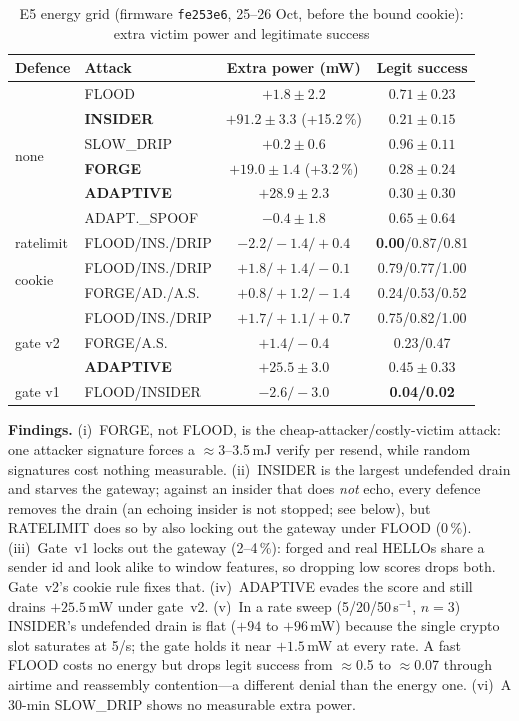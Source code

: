 \documentclass[conference]{IEEEtran}
\begin{document}
\begin{table}[t]
\caption{E5 energy grid (firmware \texttt{fe253e6}, 25--26 Oct, before the bound cookie): extra victim power and
legitimate success}
\label{tab:e5}
\centering\small
\setlength{\tabcolsep}{2pt}\footnotesize
\begin{tabular}{llcc}
\toprule
Defence & Attack & Extra power (mW) & Legit success\\
\midrule
\multirow{6}{*}{none} & FLOOD & $+1.8\pm2.2$ & $0.71\pm0.23$\\
 & \textbf{INSIDER} & $\mathbf{+91.2\pm3.3}$ (+15.2\,\%) & $0.21\pm0.15$\\
 & SLOW\_DRIP & $+0.2\pm0.6$ & $0.96\pm0.11$\\
 & \textbf{FORGE} & $\mathbf{+19.0\pm1.4}$ (+3.2\,\%) & $0.28\pm0.24$\\
 & \textbf{ADAPTIVE} & $\mathbf{+28.9\pm2.3}$ & $0.30\pm0.30$\\
 & ADAPT.\_SPOOF & $-0.4\pm1.8$ & $0.65\pm0.64$\\
\midrule
ratelimit & FLOOD/INS./DRIP & $-2.2/-1.4/+0.4$ & \textbf{0.00}/0.87/0.81\\
\midrule
\multirow{2}{*}{cookie} & FLOOD/INS./DRIP & $+1.8/+1.4/-0.1$ & 0.79/0.77/1.00\\
 & FORGE/AD./A.S. & $+0.8/+1.2/-1.4$ & 0.24/0.53/0.52\\
\midrule
\multirow{3}{*}{gate v2} & FLOOD/INS./DRIP & $+1.7/+1.1/+0.7$ & 0.75/0.82/1.00\\
 & FORGE/A.S. & $+1.4/-0.4$ & 0.23/0.47\\
 & \textbf{ADAPTIVE} & $\mathbf{+25.5\pm3.0}$ & $0.45\pm0.33$\\
\midrule
gate v1 & FLOOD/INSIDER & $-2.6/-3.0$ & \textbf{0.04/0.02}\\
\bottomrule
\end{tabular}
\end{table}

\textbf{Findings.} (i)~FORGE, not FLOOD, is the cheap-attacker/costly-victim attack: one attacker signature forces a
$\approx$3--3.5\,mJ verify per resend, while random signatures cost nothing measurable. (ii)~INSIDER is the largest
undefended drain and starves the gateway; against an insider that does \emph{not} echo, every defence removes the
drain (an echoing insider is not stopped; see below), but RATELIMIT does so by also locking out the gateway under
FLOOD (0\,\%). (iii)~Gate~v1 locks out the gateway (2--4\,\%): forged and real HELLOs share a
sender id and look alike to window features, so dropping low scores drops both. Gate~v2's cookie rule fixes that.
(iv)~ADAPTIVE evades the score and still drains $+25.5$\,mW under gate~v2. (v)~In a rate sweep (5/20/50\,s$^{-1}$,
$n=3$) INSIDER's undefended drain is flat ($+94$ to $+96$\,mW) because the single crypto slot saturates at 5/s; the
gate holds it near $+1.5$\,mW at every rate. A fast FLOOD costs no energy but drops legit success from $\approx$0.5
to $\approx$0.07 through airtime and reassembly contention---a different denial than the energy one. (vi)~A 30-min
SLOW\_DRIP shows no measurable extra power.
\end{document}
